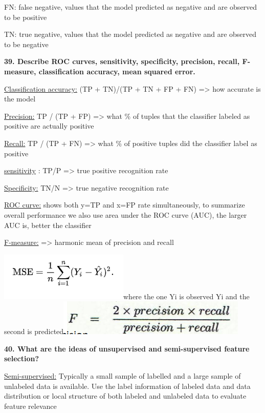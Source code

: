 FN: false negative, values that the model predicted as negative and are
observed to be positive

TN: true negative, values that the model predicted as negative and are
observed to be negative

\textbf{39. Describe ROC curves, sensitivity, specificity, precision,
recall, F-measure, classification accuracy, mean squared error.}

\underline{Classification accuracy:} (TP + TN)/(TP + TN + FP + FN)
=\textgreater{} how accurate is the model

\underline{Precision:} TP / (TP + FP) =\textgreater{} what \% of tuples
that the classifier labeled as positive are actually positive

\underline{Recall:} TP / (TP + FN) =\textgreater{} what \% of positive
tuples did the classifier label as positive

\underline{sensitivity} : TP/P =\textgreater{} true positive recognition
rate

\underline{Specificity:} TN/N =\textgreater{} true negative recognition
rate

\underline{ROC curve:} shows both y=TP and x=FP rate simultaneously, to
summarize overall performance we also use area under the ROC curve
(AUC), the larger AUC is, better the classifier

\underline{F-measure:} =\textgreater{} harmonic mean of precision and
recall

\includegraphics[width=2.42708in,height=0.90625in]{media/image12.png}where
the one Yi is observed Yi and the second is
predicted\includegraphics[width=3.55208in,height=0.66667in]{media/image38.png}

\textbf{40. What are the ideas of unsupervised and semi-supervised
feature selection?}

\underline{Semi-supervised:} Typically a small sample of labelled and a
large sample of unlabeled data is available. Use the label information
of labeled data and data distribution or local structure of both labeled
and unlabeled data to evaluate feature relevance

